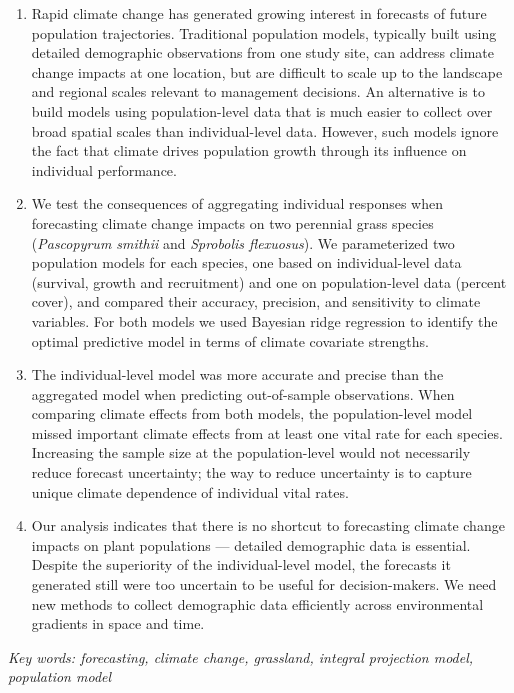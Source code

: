 \documentclass[12pt,]{article}
\begin{document}
\begin{enumerate}
\def\labelenumi{\arabic{enumi}.}
\itemsep1pt\parskip0pt
\item
  Rapid climate change has generated growing interest in forecasts of
  future population trajectories. Traditional population models,
  typically built using detailed demographic observations from one study
  site, can address climate change impacts at one location, but are
  difficult to scale up to the landscape and regional scales relevant to
  management decisions. An alternative is to build models using
  population-level data that is much easier to collect over broad
  spatial scales than individual-level data. However, such models ignore
  the fact that climate drives population growth through its influence
  on individual performance.
\item
  We test the consequences of aggregating individual responses when
  forecasting climate change impacts on two perennial grass species
  (\emph{Pascopyrum smithii} and \emph{Sprobolis flexuosus}). We
  parameterized two population models for each species, one based on
  individual-level data (survival, growth and recruitment) and one on
  population-level data (percent cover), and compared their accuracy,
  precision, and sensitivity to climate variables. For both models we
  used Bayesian ridge regression to identify the optimal predictive
  model in terms of climate covariate strengths.
\item
  The individual-level model was more accurate and precise than the
  aggregated model when predicting out-of-sample observations. When
  comparing climate effects from both models, the population-level model
  missed important climate effects from at least one vital rate for each
  species. Increasing the sample size at the population-level would not
  necessarily reduce forecast uncertainty; the way to reduce uncertainty
  is to capture unique climate dependence of individual vital rates.
\item
  Our analysis indicates that there is no shortcut to forecasting
  climate change impacts on plant populations --- detailed demographic
  data is essential. Despite the superiority of the individual-level
  model, the forecasts it generated still were too uncertain to be
  useful for decision-makers. We need new methods to collect demographic
  data efficiently across environmental gradients in space and time.
\end{enumerate}

\emph{Key words: forecasting, climate change, grassland, integral
projection model, population model}
\end{document}
